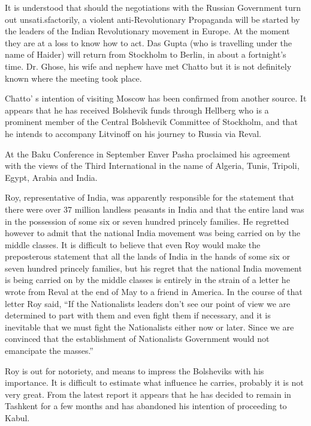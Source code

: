 It is understood that should the negotiations with the Russian Government turn out unsati.sfactorily, a violent anti-Revolutionary Propaganda will be started by the leaders of the Indian Revolutionary movement in Europe. At the moment they are at a loss to know how to act. Das Gupta (who is travelling under the name of Haider) will return from Stockholm to Berlin, in about a fortnight’s time. Dr. Ghose, his wife and nephew have met Chatto but it is not definitely known where the meeting took place. 

Chatto’ s intention of visiting Moscow has been confirmed from another source. It appears that he has received Bolshevik funds through Hellberg who is a prominent member of the Central Bolshevik Committee of Stockholm, and that he intends to accompany Litvinoff on his journey to Russia via Reval. 

At the Baku Conference in September Enver Pasha proclaimed his agreement with the views of the Third International in the name of Algeria, Tunis, Tripoli, Egypt, Arabia and India. 

Roy, representative of India, was apparently responsible for the statement that there were over 37 million landless peasants in India and that the entire land was in the possession of some six or seven hundred princely families. He regretted however to admit that the national India movement was being carried on by the middle classes. It is difficult to believe that even Roy would make the preposterous statement that all the lands of India in the hands of some six or seven hundred princely families, but his regret that the national India movement is being carried on by the middle classes is entirely in the strain of a letter he wrote from Reval at the end of May to a friend in America. In the course of that letter Roy said, 
“If the Nationalists leaders don’t see our point of view we are determined to part with them and even fight them if necessary, and it is inevitable that we must fight the Nationalists either now or later. Since we are convinced that the establishment of Nationalists Government would not emancipate the masses.” 

Roy is out for notoriety, and means to impress the Bolsheviks with his importance. It is difficult to estimate what influence he carries, probably it is not very great. From the 
latest report it appears that he has decided to remain in Tashkent for a few months and has abandoned his intention of proceeding to Kabul. 

